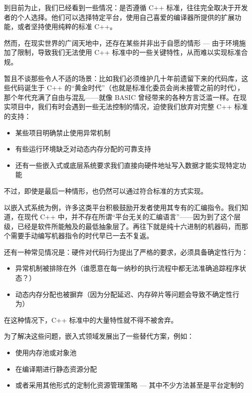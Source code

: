 到目前为止，我们已经看到一些情况：是否遵循 C++ 标准，往往完全取决于开发者的个人选择。他们可以选择特定平台，使用自己喜爱的编译器所提供的扩展功能，或者坚持使用纯粹的标准 C++。

然而，在现实世界的广阔天地中，还存在某些并非出于自愿的情形 --- 由于环境施加了限制，导致我们无法使用 C++ 标准中的一些关键特性，从而难以实现标准合规。

暂且不谈那些令人不适的场景：比如我们必须维护几十年前遗留下来的代码库，这些代码诞生于 C++ 的“黄金时代”（也就是标准化委员会尚未接管之前的时代），那个年代充满了自由与混乱——就像 BASIC 曾经带来的各种方言泛滥一样。在现实项目中，我们有时会遇到一些无法控制的情况，迫使我们放弃对完整 C++ 标准的支持：

\begin{itemize}
\item 
某些项目明确禁止使用异常机制

\item 
有些运行环境缺乏对动态内存分配的可靠支持

\item 
还有一些嵌入式或底层系统要求我们直接向硬件地址写入数据才能实现特定功能
\end{itemize}

不过，即使是最后一种情形，也仍然可以通过符合标准的方式实现。

以嵌入式系统为例，许多这类平台积极鼓励开发者使用其专有的汇编指令。我们知道，在现代 C++ 中，并不存在所谓“平台无关的汇编语言”——因为到了这个层级，已经是软件所能触及的最低抽象层了。再往下就是纯十六进制的机器码，而那个需要手动编写机器指令的时代早已一去不复返。

还有一种常见情况是：硬件对代码行为提出了严格的要求，必须具备确定性行为：

\begin{itemize}
\item 
异常机制被排除在外（谁愿意在每一纳秒的执行流程中都无法准确追踪程序状态？）

\item 
动态内存分配也被摒弃（因为分配延迟、内存碎片等问题会导致不确定性行为）
\end{itemize}

在这种情况下，C++ 标准中的大量特性就不得不被舍弃。

为了解决这些问题，嵌入式领域发展出了一些替代方案，例如：

\begin{itemize}
\item 
使用内存池或对象池

\item 
在编译期进行静态资源分配

\item 
或者采用其他形式的定制化资源管理策略 --- 其中不少方法甚至是平台定制的
\end{itemize}

